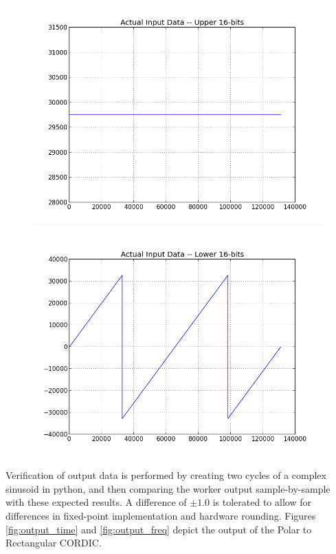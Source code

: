 \documentclass{article}
\begin{document}
	\begin{figure}[ht]
		\centering
		\begin{minipage}{.5\textwidth}
			\centering\includegraphics[width=1.0\linewidth]{input_magnitude}
			\label{fig:input_magnitude}
		\end{minipage}%
		\begin{minipage}{.5\textwidth}
			\centering\includegraphics[width=1.0\linewidth]{input_phase}
			\label{fig:input_phase}
		\end{minipage}
	\end{figure}

\begin{flushleft}
	Verification of output data is performed by creating two cycles of a complex sinusoid in python, and then comparing the worker output sample-by-sample with these expected results. A difference of $\pm1.0$ is tolerated to allow for differences in fixed-point implementation and hardware rounding. Figures \ref{fig:output_time} and \ref{fig:output_freq} depict the output of the Polar to Rectangular CORDIC.
\end{flushleft}
\end{document}
